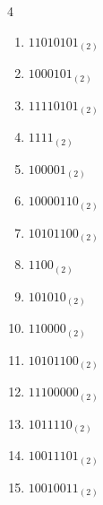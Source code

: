 \begin{multicols}{4}
\begin{enumerate}
        \phantom{$=60$}

  \item $11010101_{(2)}$

        \phantom{$=213$}

\columnbreak %

  \item $1000101_{(2)}$

        \phantom{$=69$}

  \item $11110101_{(2)}$

        \phantom{$=245$}

  \item $1111_{(2)}$

        \phantom{$=15$}

  \item $100001_{(2)}$

        \phantom{$=33$}

  \item $10000110_{(2)}$

        \phantom{$=134$}

  \item $10101100_{(2)}$

        \phantom{$=172$}

  \item $1100_{(2)}$

        \phantom{$=12$}

  \item $101010_{(2)}$

        \phantom{$=42$}

  \item $110000_{(2)}$

        \phantom{$=48$}

  \item $10101100_{(2)}$

        \phantom{$=172$}

  \item $11100000_{(2)}$

        \phantom{$=224$}

  \item $1011110_{(2)}$

        \phantom{$=94$}

  \item $10011101_{(2)}$

        \phantom{$=157$}

  \item $10010011_{(2)}$


\end{enumerate}
\end{multicols}
